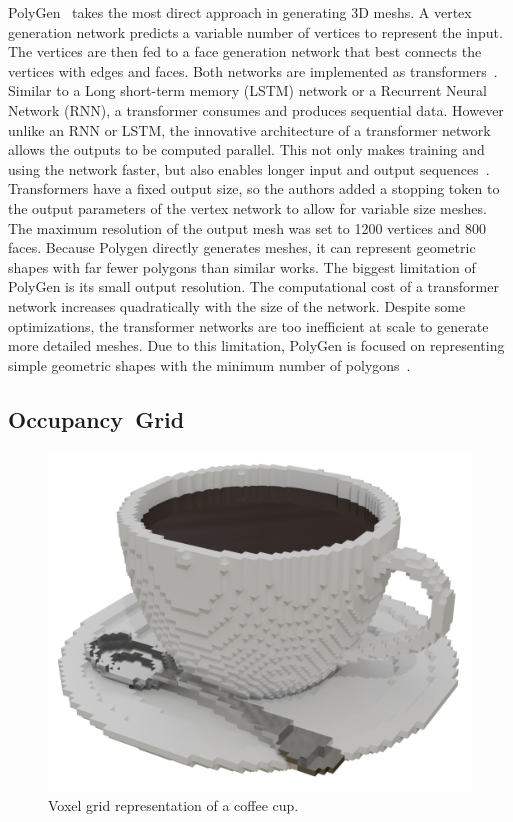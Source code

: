 PolyGen~\cite{Nash2020} takes the most direct approach in generating 3D meshs. A vertex generation network predicts a variable number of vertices to represent the input. The vertices are then fed to a face generation network that best connects the vertices with edges and faces. Both networks are implemented as transformers~\cite{Nash2020}. Similar to a Long short-term memory (LSTM) network or a Recurrent Neural Network (RNN), a transformer consumes and produces sequential data. However unlike  an RNN or LSTM, the innovative architecture of a transformer network allows the outputs to be computed parallel. This not only makes training and using the network faster, but also enables longer input and output sequences~\cite{Vaswani2017}. Transformers have a fixed output size, so the authors added a stopping token to the output parameters of the vertex network to allow for variable size meshes. The maximum resolution of the output mesh was set to 1200 vertices and 800 faces. Because Polygen directly generates meshes, it can represent geometric shapes with far fewer polygons than similar works. The biggest limitation of PolyGen is its small output resolution. The computational cost of a transformer network increases quadratically with the size of the network. Despite some optimizations, the transformer networks are too inefficient at scale to generate more detailed meshes. Due to this limitation, PolyGen is focused on representing simple geometric shapes with the minimum number of polygons~\cite{Nash2020}.

\newpage


\subsection{Occupancy~Grid}
\label{subsec:occupancy_grid}

\begin{figure}[ht]
	\centering
	\includegraphics[scale=0.2]{Images/Voxel Cup}
	\caption{Voxel grid representation of a coffee cup.}
	\label{fig:voxel_cup}
\end{figure}

